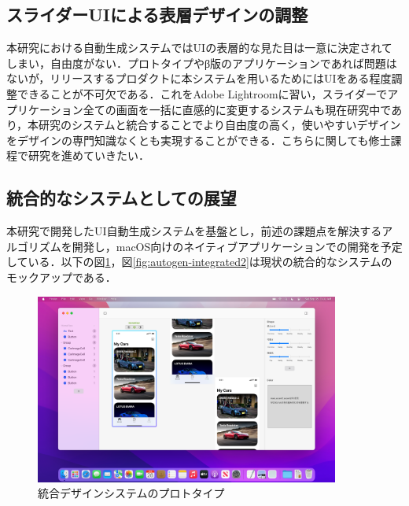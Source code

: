 \subsection{スライダーUIによる表層デザインの調整}
本研究における自動生成システムではUIの表層的な見た目は一意に決定されてしまい，自由度がない．プロトタイプやβ版のアプリケーションであれば問題はないが，リリースするプロダクトに本システムを用いるためにはUIをある程度調整できることが不可欠である．これをAdobe Lightroomに習い，スライダーでアプリケーション全ての画面を一括に直感的に変更するシステムも現在研究中であり，本研究のシステムと統合することでより自由度の高く，使いやすいデザインをデザインの専門知識なくとも実現することができる．こちらに関しても修士課程で研究を進めていきたい．

\subsection{統合的なシステムとしての展望}
本研究で開発したUI自動生成システムを基盤とし，前述の課題点を解決するアルゴリズムを開発し，macOS向けのネイティブアプリケーションでの開発を予定している．以下の図\ref{fig:autogen-integrated}，図\ref{fig:autogen-integrated2}は現状の統合的なシステムのモックアップである．

\begin{figure}[htbp]
  \begin{minipage}{\hsize}
    \begin{center}
       \includegraphics[width=100mm]{img/autogen-integrated.png}
    \end{center}
    \caption{統合デザインシステムのプロトタイプ}
    \label{fig:autogen-integrated}
  \end{minipage}
\end{figure}


